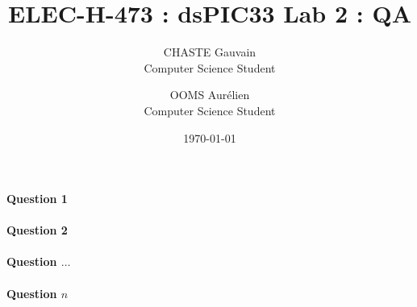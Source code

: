 \documentclass[10pt]{article}
\title{ELEC-H-473 : dsPIC33 Lab 2 : QA}
\author{CHASTE Gauvain  \\
	Computer Science Student \\
	\and 
	OOMS Aurélien \\
	Computer Science Student \\
}
\date{\today}
\begin{document}
\maketitle

\paragraph{Question 1}

\paragraph{Question 2}

\paragraph{Question $\dots$}

\paragraph{Question $n$}
\end{document}
